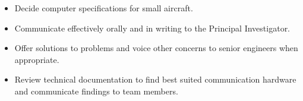\duties
\begin{itemize}[leftmargin=*]
\item Decide computer specifications for small aircraft.
\item Communicate effectively orally and in writing to the Principal Investigator.
\item Offer solutions to problems and voice other concerns to senior engineers when appropriate.
\item Review technical documentation to find best suited communication hardware and communicate findings to team members.
\end{itemize}